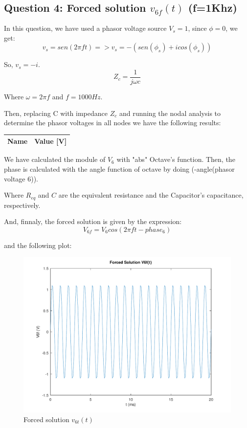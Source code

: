\subsection{Question 4: Forced solution $v_{6f}(t)$ (f=1Khz)}
In this question, we have used a phasor voltage source $V_s = 1$, since $\phi = 0$, we get:
\begin{equation}
     v_s = sen(2\pi ft) => v_s = -(sen(\phi_s) + icos(\phi_s))
\end{equation}\par
So, $v_s=-i$.
\begin{equation}
     Z_c = \frac{1}{j\omega c}
\end{equation}\par
Where $\omega= 2\pi f$ and $f= 1000Hz$.\par

Then, replacing C with  impedance $Z_c$ and running the nodal analysis to determine the phasor voltages in all nodes we have the following results:\par

\begin{center}
  \begin{tabular}{ | c | c | }
    \hline    
    {\bf Name} & {\bf Value [V]} \\ \hline
    
    \hline
  \end{tabular}
\end{center}

We have calculated the module of $V_6$ with "abs" Octave's function. Then, the phase is calculated with the angle function of octave by doing (-angle(phasor voltage 6)). \par

Where $R_{eq}$ and $C$ are the equivalent resistance and the Capacitor's capacitance, respectively.

And, finnaly, the forced solution is given by the expression:
\begin{equation}
     V_{6f}= V_6cos({2\pi f}{t} - phase_6)
\end{equation}\par
and the following plot:\par

\begin{figure}[H] \centering
\includegraphics[width=0.7\linewidth]{../mat/alinea4.pdf}
\caption{Forced solution $v_{6t}(t)$}
\label{fig:plot4}
\end{figure}

